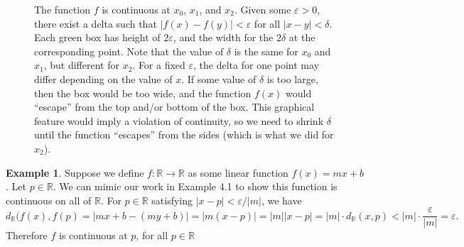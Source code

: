 \documentclass{article}
\newcommand{\R}{\mathbb{R}}
\theoremstyle{definition}
\newtheorem{example}{Example}[section]
\begin{document}
	\begin{figure}[h!]
		\centering
		\caption{The function $ f $ is continuous at $ x_0 $, $ x_1 $, and $ x_2 $. Given some $ \varepsilon>0 $, there exist a delta such that $ |f(x)-f(y)|<\varepsilon $ for all $ |x-y|<\delta $. Each green box has height of $ 2\varepsilon $, and the width for the $ 2\delta $ at the corresponding point. Note that the value of $ \delta $ is the same for $ x_0 $ and $ x_1 $, but different for $ x_2 $. For a fixed $ \varepsilon $, the delta for one point may differ depending on the value of $ x $. If some value of $ \delta $ is too large, then the box would be too wide, and the function $ f(x) $ would ``escape'' from the top and/or bottom of the box. This graphical feature would imply a violation of continuity, so we need to shrink $ \delta $ until the function ``escapes'' from the sides (which is what we did for $ x_2 $).   }
	\end{figure}
	\begin{example}
		Suppose we define $ f:\R\to\R $ as some linear function $ f(x)=mx+b $. Let $ p\in\R $. We can mimic our work in Example 4.1 to show this function is continuous on all of $ \R $. For $ p\in\R $ satisfying $ |x-p|<\varepsilon/|m| $, we have$$ d_\R(f(x),f(p)=|mx+b-(my+b)|=|m(x-p)|=|m||x-p|=|m|\cdot d_\R(x,p)<|m|\cdot\frac{\varepsilon}{|m|}=\varepsilon .$$ Therefore $ f $ is continuous at $ p $, for all $ p\in\R $
	\end{example}
\end{document}
